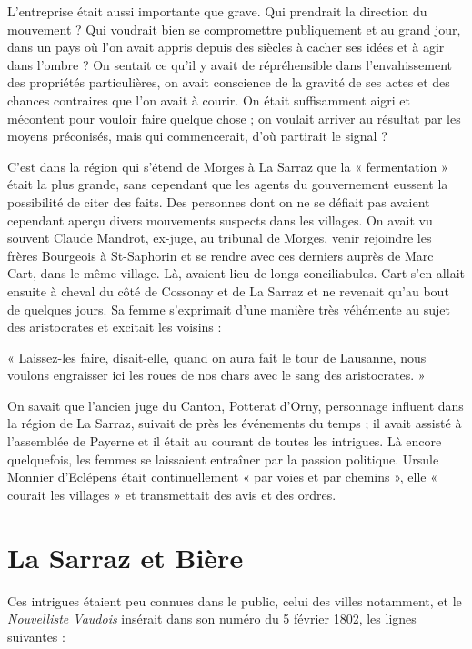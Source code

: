 \documentclass[french,twoside]{book} %
\newenvironment{quoteblock}%
  {\begin{quoting}}
  {\end{quoting}}
\newenvironment{quotebar}{%
    \def\FrameCommand{{\color{rubric!10!}\vrule width 0.5em} \hspace{0.9em}}%
    \def\OuterFrameSep{\itemsep} %
    \MakeFramed {\advance\hsize-\width \FrameRestore}
  }%
  {%
    \endMakeFramed
  }
\renewenvironment{quoteblock}%
  {%
    \savenotes
    \setstretch{0.9}
    \begin{quotebar}
  }
  {%
    \end{quotebar}
    \spewnotes
  }
\begin{document}
L’entreprise était aussi importante que grave. Qui prendrait la direction du mouvement ? Qui voudrait bien se compromettre publiquement et au grand jour, dans un pays où l’on avait appris depuis des siècles à cacher ses idées et à agir dans l’ombre ? On sentait ce qu’il y avait de répréhensible dans l’envahissement des propriétés particulières, on avait conscience de la gravité de ses actes et des chances contraires que l’on avait à courir. On était suffisamment aigri et mécontent pour vouloir faire quelque chose ; on voulait arriver au résultat par les moyens préconisés, mais qui commencerait, d’où partirait le signal ?\par
C’est dans la région qui s’étend de Morges à La Sarraz que la « fermentation » était la plus grande, sans cependant que les agents du gouvernement eussent la possibilité de citer des faits. Des personnes dont on ne se défiait pas avaient cependant aperçu divers mouvements suspects dans les villages. On avait vu souvent Claude Mandrot, ex-juge, au tribunal de Morges, venir rejoindre les frères Bourgeois à St-Saphorin et se rendre avec ces derniers auprès de Marc Cart, dans le même village. Là, avaient lieu de longs conciliabules. Cart s’en allait ensuite à cheval du côté de Cossonay et de La Sarraz et ne revenait qu’au bout de quelques jours. Sa femme s’exprimait d’une manière très véhémente au sujet des aristocrates et excitait les voisins :\par

\begin{quoteblock}
\noindent « Laissez-les faire, disait-elle, quand on aura fait le tour de Lausanne, nous voulons engraisser ici les roues de nos chars avec le sang des aristocrates. »\end{quoteblock}

\noindent On savait que l’ancien juge du Canton, Potterat d’Orny, personnage influent dans la région de La Sarraz, suivait de près les événements du temps ; il avait assisté à l’assemblée de Payerne et il était au courant de toutes les intrigues. Là encore quelquefois, les femmes se laissaient entraîner par la passion politique. Ursule Monnier d’Eclépens était continuellement « par voies et par chemins », elle « courait les villages » et transmettait des avis et des ordres.
\section[La Sarraz et Bière]{La Sarraz et Bière}
\noindent Ces intrigues étaient peu connues dans le public, celui des villes notamment, et le \emph{Nouvelliste Vaudois} insérait dans son numéro du 5 février 1802, les lignes suivantes :\par
\end{document}
